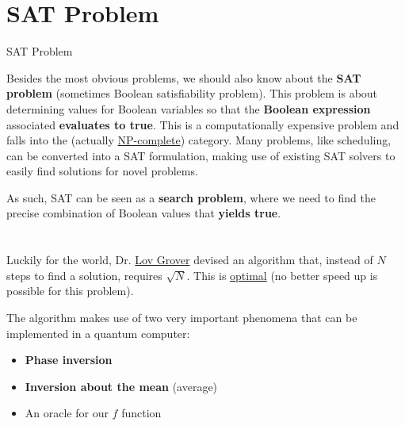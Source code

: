 \documentclass[aspectratio=43]{beamer}
\begin{document}
\section{SAT Problem}
\begin{frame}{SAT Problem}
    \begin{card}
        \small{Besides the most obvious problems, we should also know about the \textbf{SAT problem} (sometimes Boolean satisfiability problem). This problem is about determining values for Boolean variables so that the \textbf{Boolean expression} associated \textbf{evaluates to true}. This is a computationally expensive problem and falls into the \np (actually \href{https://en.wikipedia.org/wiki/NP-completeness}{NP-complete}) category. Many problems, like scheduling, can be converted into a SAT formulation, making use of existing SAT solvers to easily find solutions for novel problems.}
    \end{card}
    \begin{card}
        \small{As such, SAT can be seen as a \textbf{search problem}, where we need to find the precise combination of Boolean values that \textbf{yields true}.}
    \end{card}
\pagenumber
\end{frame}

\section{\gvsa} %
\begin{frame}{\gvsa}
    \begin{card}
        Luckily for the world, Dr. \href{https://en.wikipedia.org/wiki/Lov_Grover}{Lov Grover} devised an algorithm that, instead of $N$ steps to find a solution, requires $\sqrt{N}$. This is \href{https://arxiv.org/abs/quant-ph/9711070}{optimal} (no better speed up is possible for this problem). 
    \end{card}
    \begin{card}
        The algorithm makes use of two very important phenomena that can be implemented in a quantum computer:\begin{itemize}
            \item \textbf{Phase inversion}
            \item \textbf{Inversion about the mean} (average)
            \item An oracle for our $f$ function
        \end{itemize}
    \end{card}
\pagenumber
\end{frame}
\end{document}
